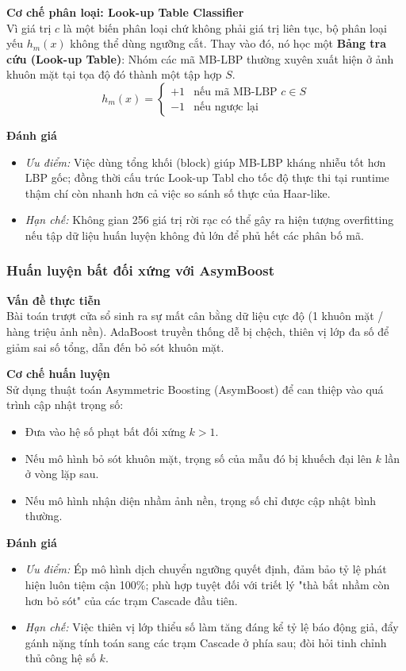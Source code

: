 \noindent\textbf{Cơ chế phân loại: Look-up Table Classifier}
\\
Vì giá trị $c$ là một biến phân loại chứ không phải giá trị liên tục, bộ phân loại yếu $h_m(x)$ không thể dùng ngưỡng cắt. Thay vào đó, nó học một \textbf{Bảng tra cứu (Look-up Table)}: Nhóm các mã MB-LBP thường xuyên xuất hiện ở ảnh khuôn mặt tại tọa độ đó thành một tập hợp $S$. 
$$h_m(x) = \begin{cases} +1 & \text{nếu mã MB-LBP } c \in S \\ -1 & \text{nếu ngược lại} \end{cases}$$

\noindent\textbf{Đánh giá}
\begin{itemize}
  \item \textit{Ưu điểm:} Việc dùng tổng khối (block) giúp MB-LBP kháng nhiễu tốt hơn LBP gốc; đồng thời cấu trúc Look-up Tabl cho tốc độ thực thi tại runtime thậm chí còn nhanh hơn cả việc so sánh số thực của Haar-like.
  \item \textit{Hạn chế:} Không gian 256 giá trị rời rạc có thể gây ra hiện tượng overfitting nếu tập dữ liệu huấn luyện không đủ lớn để phủ hết các phân bố mã.
\end{itemize}

\subsubsection{Huấn luyện bất đối xứng với AsymBoost}

\noindent\textbf{Vấn đề thực tiễn}
\\
Bài toán trượt cửa sổ sinh ra sự mất cân bằng dữ liệu cực độ (1 khuôn mặt / hàng triệu ảnh nền). AdaBoost truyền thống dễ bị chệch, thiên vị lớp đa số để giảm sai số tổng, dẫn đến bỏ sót khuôn mặt.

\noindent\textbf{Cơ chế huấn luyện}
\\
Sử dụng thuật toán Asymmetric Boosting (AsymBoost) để can thiệp vào quá trình cập nhật trọng số:
\begin{itemize}
  \item Đưa vào hệ số phạt bất đối xứng $k > 1$.
  \item Nếu mô hình bỏ sót khuôn mặt, trọng số của mẫu đó bị khuếch đại lên $k$ lần ở vòng lặp sau.
  \item Nếu mô hình nhận diện nhầm ảnh nền, trọng số chỉ được cập nhật bình thường.
\end{itemize}

\noindent\textbf{Đánh giá}
\begin{itemize}
  \item \textit{Ưu điểm:} Ép mô hình dịch chuyển ngưỡng quyết định, đảm bảo tỷ lệ phát hiện luôn tiệm cận 100\%; phù hợp tuyệt đối với triết lý "thà bắt nhầm còn hơn bỏ sót" của các trạm Cascade đầu tiên.
  \item \textit{Hạn chế:} Việc thiên vị lớp thiểu số làm tăng đáng kể tỷ lệ báo động giả, đẩy gánh nặng tính toán sang các trạm Cascade ở phía sau; đòi hỏi tinh chỉnh thủ công hệ số $k$.
\end{itemize}

